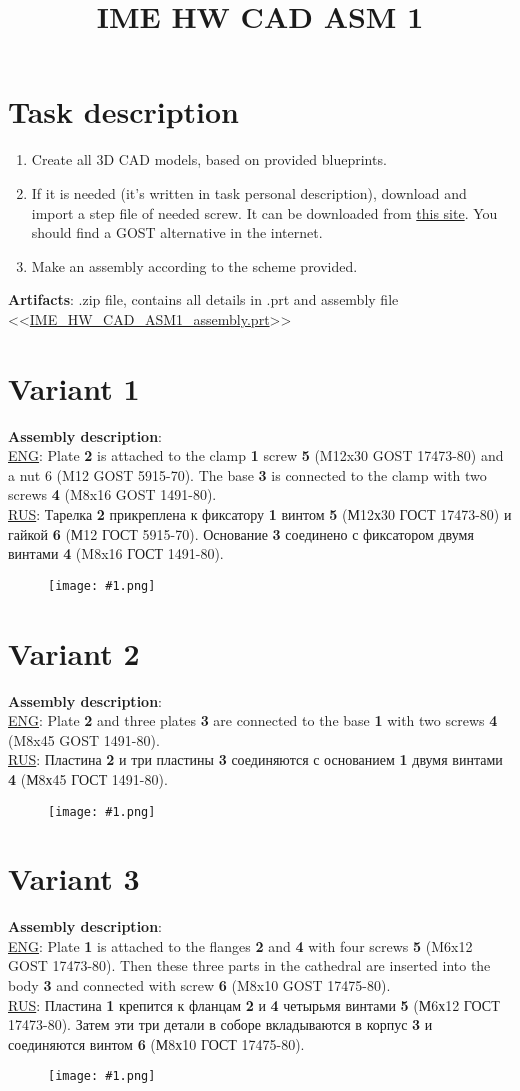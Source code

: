 \documentclass{article}
\title{IME HW CAD ASM 1} %
\author{} %
\date{}
\newcommand\ttask[3] 
 {
	\section*{Variant #1}
	\textbf{Assembly description}: \\
	\underline{ENG}: #2 \smallskip \\ 
	\underline{RUS}: #3
	\begin{figure}[H]
		\centering\texttt{[image: \#1.png]}
		\label{fig:#1.png}
	\end{figure}
	\newpage
 }
\begin{document}
	\maketitle %
    
	\section{Task description}
	\begin{enumerate}
		\item Create all 3D CAD models, based on provided blueprints.
		\item If it is needed (it's written in task personal description), download and import a step file of needed screw. It can be downloaded from \href{https://www.mcmaster.com/}{this site}. You should find a GOST alternative in the internet. 
		\item Make an assembly according to the scheme provided.
	\end{enumerate}
	\textbf{Artifacts}: .zip file, contains all details in .prt and assembly file <<\url{IME_HW_CAD_ASM1_assembly.prt}>>

	\newpage
	\ttask{1}{Plate \textbf{2} is attached to the clamp \textbf{1} screw \textbf{5} (M12x30 GOST 17473-80) and a nut 6 (M12 GOST 5915-70). The base \textbf{3} is connected to the clamp with two screws \textbf{4} (M8x16 GOST 1491-80).}{Тарелка \textbf{2} прикреплена к фиксатору \textbf{1} винтом \textbf{5} (М12х30 ГОСТ 17473-80) и гайкой \textbf{6} (М12 ГОСТ 5915-70). Основание \textbf{3} соединено с фиксатором двумя винтами \textbf{4} (M8x16 ГОСТ 1491-80).}
	
	\ttask{2}{Plate \textbf{2} and three plates \textbf{3} are connected to the base \textbf{1} with two screws \textbf{4} (M8x45 GOST 1491-80).}{Пластина \textbf{2} и три пластины \textbf{3} соединяются с основанием \textbf{1} двумя винтами \textbf{4} (М8х45 ГОСТ 1491-80).}

	\ttask{3}{Plate \textbf{1} is attached to the flanges \textbf{2} and \textbf{4} with four screws \textbf{5} (M6x12 GOST 17473-80). Then these three parts in the cathedral are inserted into the body \textbf{3} and connected with screw \textbf{6} (M8x10 GOST 17475-80).}{Пластина \textbf{1} крепится к фланцам \textbf{2} и \textbf{4} четырьмя винтами \textbf{5} (М6х12 ГОСТ 17473-80). Затем эти три детали в соборе вкладываются в корпус \textbf{3} и соединяются винтом \textbf{6} (М8х10 ГОСТ 17475-80).}
\end{document}
